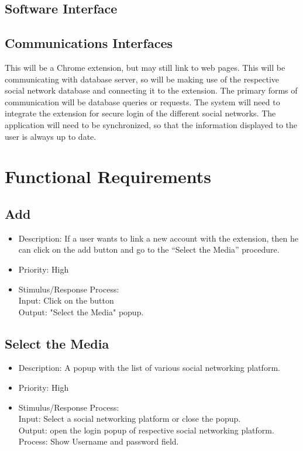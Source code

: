 \documentclass[12pt]{article}
\begin{document}
\subsection{Software Interface}

\subsection{ Communications Interfaces}
This will be a Chrome extension, but may still link to web
pages. This will be communicating with database server, so
will be making use of the respective social network
database and connecting it to the extension. The primary
forms of communication will be database queries or
requests. The system will need to integrate the extension
for secure login of the different social networks. The
application will need to be synchronized, so that the
information displayed to the user is always up to date.

\section{Functional Requirements}
\subsection{Add}
\begin{itemize}
    \item Description: If a user wants to link a new account with the
extension, then he can click on the add button and go to the
“Select the Media” procedure. 
    \item Priority: High
    \item 
 Stimulus/Response Process:\\
Input: Click on the button\\
Output: "Select the Media" popup.
\end{itemize}

\subsection{Select the Media}
\begin{itemize}
    \item Description: A popup with the list of various social networking
platform.
    \item Priority: High 
    \item Stimulus/Response Process:\\
Input: Select a social networking platform or close the
popup.\\
Output: open the login popup of respective social
networking platform.\\
Process: Show Username and password field.
\end{itemize}
\end{document}
